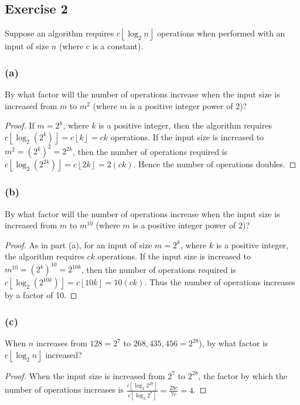 \documentclass[14pt]{extarticle}
\newcommand{\dps}{\displaystyle}
\newcommand{\floor}[1]{{\left\lfloor#1\right\rfloor}}
\begin{document}
\subsection{Exercise 2}
Suppose an algorithm requires \(c \floor{\log_2 n}\) operations when performed with an input of size \(n\) (where 
\(c\) is a constant).

\subsubsection{(a)}
By what factor will the number of operations increase when the input size is increased from \(m\) to \(m^2\) (where \(m\) is 
a positive integer power of 2)?

\begin{proof}
If \(m = 2^k\), where \(k\) is a positive integer, then the algorithm requires \(c \floor{\log_2(2^k)} = c\floor{k} = ck\) 
operations. If the input size is increased to \(m^2 = (2^k)^2 = 2^{2k}\), then the number of operations required is 
\(c \floor{\log_2(2^{2k})} = c \floor{2k} = 2(ck)\). Hence the 
number of operations doubles.
\end{proof}

\subsubsection{(b)}
By what factor will the number of operations increase when the input size is increased from \(m\) to \(m^{10}\) (where \(m\) 
is a positive integer power of 2)?

\begin{proof}
As in part (a), for an input of size \(m = 2^k\), where \(k\) is a positive integer, the algorithm requires \(ck\) 
operations. If the input size is increased to \(m^{10} = (2^k)^{10} = 2^{10k}\), then the number of operations required 
is \(c \floor{\log_2(2^{10k})} = c \floor{10k} = 10(ck)\). Thus the number of operations increases by a factor of 10.
\end{proof}

\subsubsection{(c)}
When \(n\) increases from \(128 = 2^7\) to \(268,435,456 = 2^{28}\)), by what factor is \(c \floor{\log_2 n}\) increased?

\begin{proof}
When the input size is increased from \(2^7\) to \(2^{28}\), the factor by which the number of operations increases is
\(\dps \frac{c \floor{\log_2 2^{28}}}{c \floor{\log_2 2^7}} = \frac{28c}{7c} = 4\).
\end{proof}
\end{document}
